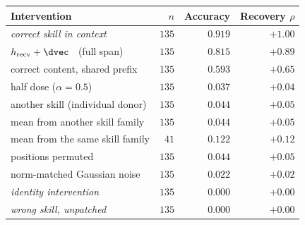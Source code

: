 \begin{tabular}{@{}lrrr@{}}
\toprule
\rowcolor{TableHeader}
\textbf{Intervention} & $n$ & \textbf{Accuracy} & \textbf{Recovery} $\rho$ \\
\midrule
\emph{correct skill in context} & $135$ & $0.919$ & $+1.00$ \\
\midrule
\rowcolor{TransferHighlight}
$h_{\text{recv}}+\dvec$ \ (full span) & $135$ & $0.815$ & $+0.89$ \\
correct content, shared prefix & $135$ & $0.593$ & $+0.65$ \\
\midrule
half dose ($\alpha=0.5$) & $135$ & $0.037$ & $+0.04$ \\
another skill (individual donor) & $135$ & $0.044$ & $+0.05$ \\
mean from another skill family & $135$ & $0.044$ & $+0.05$ \\
mean from the same skill family & $41$ & $0.122$ & $+0.12$ \\
positions permuted & $135$ & $0.044$ & $+0.05$ \\
norm-matched Gaussian noise & $135$ & $0.022$ & $+0.02$ \\
\midrule
\emph{identity intervention} & $135$ & $0.000$ & $+0.00$ \\
\emph{wrong skill, unpatched} & $135$ & $0.000$ & $+0.00$ \\
\bottomrule
\end{tabular}
